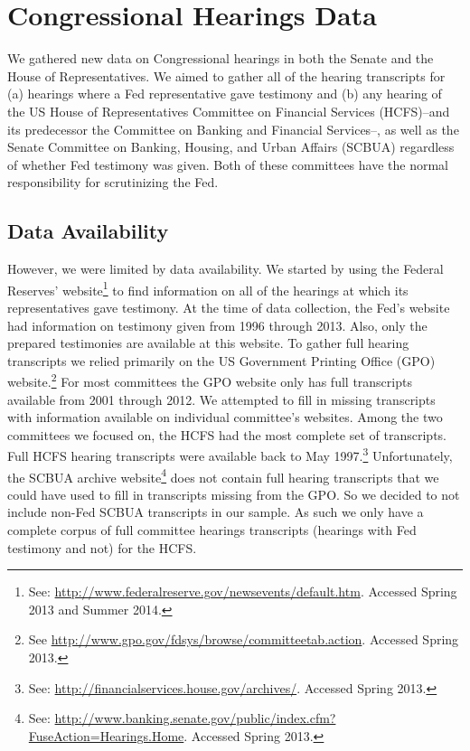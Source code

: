 \documentclass[a4paper]{article}\usepackage[]{graphicx}\usepackage[]{color}
\begin{document}
\section{Congressional Hearings Data}

We gathered new data on Congressional hearings in both the Senate and the House of Representatives. We aimed to gather all of the hearing transcripts for (a) hearings where a Fed representative gave testimony and (b) any hearing of the US House of Representatives Committee on Financial Services (HCFS)--and its predecessor the Committee on Banking and Financial Services--, as well as the Senate Committee on Banking, Housing, and Urban Affairs (SCBUA) regardless of whether Fed testimony was given. Both of these committees have the normal responsibility for scrutinizing the Fed.

\subsection{Data Availability}

However, we were limited by data availability. We started by using the Federal Reserves' website\footnote{See: \url{http://www.federalreserve.gov/newsevents/default.htm}. Accessed Spring 2013 and Summer 2014.} to find information on all of the hearings at which its representatives gave testimony. At the time of data collection, the Fed's website had information on testimony given from 1996 through 2013. Also, only the prepared testimonies are available at this website. To gather full hearing transcripts we relied primarily on the US Government Printing Office (GPO) website.\footnote{See \url{http://www.gpo.gov/fdsys/browse/committeetab.action}. Accessed Spring 2013.} For most committees the GPO website only has full transcripts available from 2001 through 2012. We attempted to fill in missing transcripts with information available on individual committee's websites. Among the two committees we focused on, the HCFS had the most complete set of transcripts. Full HCFS hearing transcripts were available back to May 1997.\footnote{See: \url{http://financialservices.house.gov/archives/}. Accessed Spring 2013.} Unfortunately, the SCBUA archive website\footnote{See: \url{http://www.banking.senate.gov/public/index.cfm?FuseAction=Hearings.Home}. Accessed Spring 2013.} does not contain full hearing transcripts that we could have used to fill in transcripts missing from the GPO. So we decided to not include non-Fed SCBUA transcripts in our sample. As such we only have a complete corpus of full committee hearings transcripts (hearings with Fed testimony and not) for the HCFS.
\end{document}

